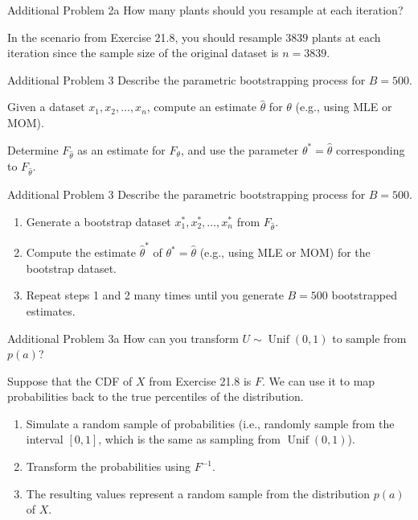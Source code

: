 \documentclass{beamer}
\begin{document}
\begin{frame}{Additional Problem 2a}
    How many plants should you resample at each iteration?
    \pause
    
    In the scenario from Exercise 21.8, you should resample $3839$ plants at each iteration since the sample size of the original dataset is $n = 3839$.
\end{frame}

\begin{frame}{Additional Problem 3}
    Describe the parametric bootstrapping process for $B = 500$.
    \pause

    Given a dataset $x_1, x_2, \dotsc, x_n$, compute an estimate $\hat{\theta}$ for $\theta$ (e.g., using MLE or MOM).
    \pause
    
    Determine $F_{\hat{\theta}}$ as an estimate for $F_\theta$, and use the parameter $\theta^* = \hat{\theta}$ corresponding to $F_{\hat{\theta}}$.
\end{frame}

\begin{frame}{Additional Problem 3}
    Describe the parametric bootstrapping process for $B = 500$.
    \begin{enumerate}
        \item Generate a bootstrap dataset $x^*_1, x^*_2, \dotsc, x^*_n$ from $F_{\hat{\theta}}$.
        \pause
        \item Compute the estimate $\hat{\theta}^*$ of $\theta^* = \hat{\theta}$ (e.g., using MLE or MOM) for the bootstrap dataset.
        \pause
        \item Repeat steps 1 and 2 many times until you generate $B = 500$ bootstrapped estimates.
    \end{enumerate}
\end{frame}

\begin{frame}{Additional Problem 3a}
    How can you transform $U \sim \operatorname{Unif}(0, 1)$ to sample from $p(a)$?
    \pause

    Suppose that the CDF of $X$ from Exercise 21.8 is $F$. We can use it to map probabilities back to the true percentiles of the distribution.
    \pause
    \begin{enumerate}
        \item Simulate a random sample of probabilities (i.e., randomly sample from the interval $[0, 1]$, which is the same as sampling from $\operatorname{Unif}(0, 1)$).
        \pause
        \item Transform the probabilities using $F^{-1}$.
        \pause
        \item The resulting values represent a random sample from the distribution $p(a)$ of $X$.
    \end{enumerate}
\end{frame}
\end{document}
